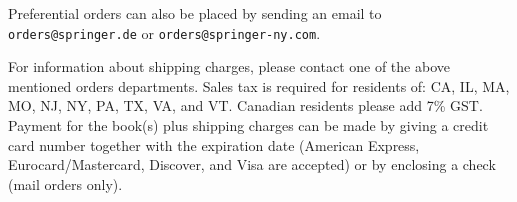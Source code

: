 \documentclass[a4paper]{llncs}
\begin{document}
\noindent Preferential orders can also be placed by sending an email
to\\

\vspace{-3mm}
\indent            \verb+orders@springer.de+
                   or \verb+orders@springer-ny.com+.\\
\vspace{-3mm}

\noindent For information about shipping charges, please
contact one of the above mentioned orders departments.
Sales tax is required for residents of: CA, IL, MA, MO, NJ, NY, PA, TX,
VA, and VT. Canadian residents please add 7\% GST.
Payment for the book(s) plus shipping charges can be made by giving a
credit card number together with the expiration date (American Express,
Eurocard/Master\-card, Discover, and Visa are accepted) or by enclosing
a check (mail orders only).
\end{document}
